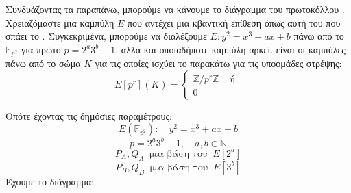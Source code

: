 \documentclass[oneside,a4paper]{article}
\begin{document}
Συνδυάζοντας τα παραπάνω, μπορούμε να κάνουμε το διάγραμμα του πρωτοκόλλου . Χρειαζόμαστε μια καμπύλη $E$ που αντέχει μια κβαντική επίθεση όπως αυτή του  που σπάει το . Συγκεκριμένα, μπορούμε να διαλέξουμε $E: y^2 = x^3 +ax+b$ πάνω από το $\mathbb{F}_{p^2}$ για πρώτο $p=2^a 3^b -1$, αλλά και οποιαδήποτε  καμπύλη αρκεί.  είναι οι καμπύλες πάνω από το σώμα $K$ για τις οποίες ισχύει το παρακάτω για τις υποομάδες στρέψης:
$$E[p^r](K) = \begin{cases}
	\mathbb{Z}/p^r \mathbb{Z} & \text{ ή }\\
	0
\end{cases}$$ 

Οπότε έχοντας τις δημόσιες παραμέτρους:
$$E(\mathbb{F}_{p^2}): \quad y^2=x^3+ax+b$$
$$p = 2^a 3^b -1, \quad a,b \in \mathbb{N}$$
$$P_A, Q_A \ \text{ μια βάση του } \ E[2^a]$$
$$P_B, Q_B \ \text{ μια βάση του } \ E[3^b]$$
Έχουμε το διάγραμμα:


\end{document}
